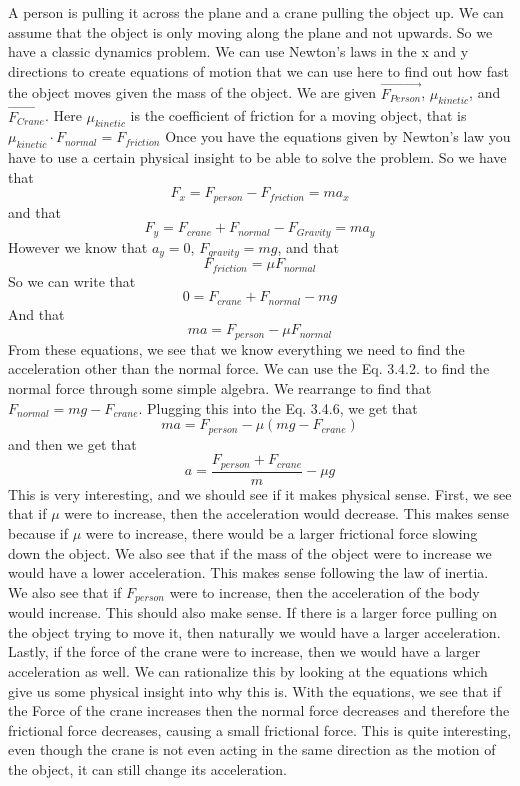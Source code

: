 A person is pulling it across the plane and a crane pulling the object up. We can assume that the object is only moving along the plane and not upwards. So we have a classic dynamics problem. We can use Newton’s laws in the x and y directions to create equations of motion that we can use here to find out how fast the object moves given the mass of the object. We are given $\vec{F_{Person}}$, $\mu_{kinetic}$, and $\vec{F_{Crane}}$. Here $\mu_{kinetic}$ is the coefficient of friction for a moving object, that is $\mu_{kinetic}\cdot F_{normal} = F_{friction}$ Once you have the equations given by Newton's law you have to use a certain physical insight to be able to solve the problem. So we have that \begin{equation}F_x=F_{person}-F_{friction}=ma_x\end{equation} and that \begin{equation}F_y=F_{crane}+F_{normal}-F_{Gravity}=ma_y\end{equation} However we know that $a_y=0$, $F_{gravity}=mg$, and that \begin{equation}F_{friction} =\mu F_{normal}\end{equation} So we can write that \begin{equation}0=F_{crane}+F_{normal}-mg\end{equation} And that \begin{equation}ma=F_{person}-\mu F_{normal}\end{equation} From these equations, we see that we know everything we need to find the acceleration other than the normal force. We can use the Eq. 3.4.2. to find the normal force through some simple algebra. We rearrange to find that $F_{normal}= mg-F_{crane}$. Plugging this into the Eq. 3.4.6, we get that \begin{equation}ma=F_{person}-\mu\left(mg-F_{crane}\right)\end{equation} and then we get that \begin{equation}a = \frac{F_{person}+F_{crane}}{m}-\mu g\end{equation} This is very interesting, and we should see if it makes physical sense. First, we see that if $\mu$ were to increase, then the acceleration would decrease. This makes sense because if $\mu$ were to increase, there would be a larger frictional force slowing down the object. We also see that if the mass of the object were to increase we would have a lower acceleration. This makes sense following the law of inertia. We also see that if $F_{person}$ were to increase, then the acceleration of the body would increase. This should also make sense. If there is a larger force pulling on the object trying to move it, then naturally we would have a larger acceleration. Lastly, if the force of the crane were to increase, then we would have a larger acceleration as well. We can rationalize this by looking at the equations which give us some physical insight into why this is. With the equations, we see that if the Force of the crane increases then the normal force decreases and therefore the frictional force decreases, causing a small frictional force. This is quite interesting, even though the crane is not even acting in the same direction as the motion of the object, it can still change its acceleration. 
